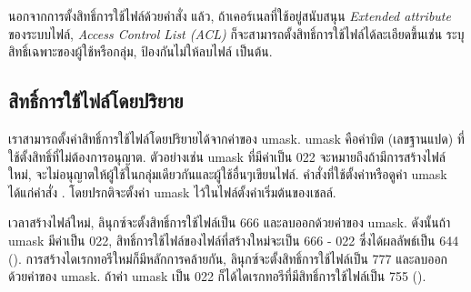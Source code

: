 \begin{thwbr}
\medskip
นอกจากการตั้งสิทธิ์การใช้ไฟล์ด้วยคำสั่ง  แล้ว, ถ้าเคอร์เนลที่ใช้อยู่สนับสนุน \emph{Extended attribute} ของระบบไฟล์, \emph{Access Control List (ACL)} ก็จะสามารถตั้งสิทธิ์การใช้ไฟล์ได้ละเอียดขึ้นเช่น ระบุสิทธิ์เฉพาะของผู้ใช้หรือกลุ่ม, ป้องกันไม่ให้ลบไฟล์ เป็นต้น.



\subsection{สิทธิ์การใช้ไฟล์โดยปริยาย}
เราสามารถตั้งค่าสิทธิ์การใช้ไฟล์โดยปริยายได้จากค่าของ umask. umask คือค่าบิต (เลขฐานแปด) ที่ใช้ตั้งสิทธิ์ที่ไม่ต้องการอนุญาต. ตัวอย่างเช่น umask ที่มีค่าเป็น 022 จะหมายถึงถ้ามีการสร้างไฟล์ใหม่, จะไม่อนุญาตให้ผู้ใช้ในกลุ่มเดียวกันและผู้ใช้อื่นๆเขียนไฟล์. คำสั่งที่ใช้ตั้งค่าหรือดูค่า umask ได้แก่คำสั่ง . โดยปรกติจะตั้งค่า umask ไว้ในไฟล์ตั้งค่าเริ่มต้นของเชลล์.
\begin{MyExample}
\end{MyExample}%

เวลาสร้างไฟล์ใหม่, ลินุกซ์จะตั้งสิทธิ์การใช้ไฟล์เป็น 666 และลบออกด้วยค่าของ umask. ดังนั้นถ้า umask มีค่าเป็น 022, สิทธิ์การใช้ไฟล์ของไฟล์ที่สร้างใหม่จะเป็น 666 - 022 ซึ่งได้ผลลัพธ์เป็น 644 (). การสร้างไดเรกทอรีใหม่ก็มีหลักการคล้ายกัน, ลินุกซ์จะตั้งสิทธิ์การใช้ไฟล์เป็น 777 และลบออกด้วยค่าของ umask. ถ้าค่า umask เป็น 022 ก็ได้ไดเรกทอรีที่มีสิทธิ์การใช้ไฟล์เป็น 755 ().




\end{thwbr}

